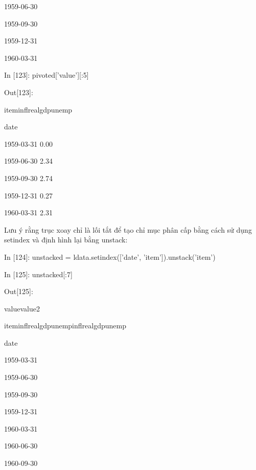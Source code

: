 \par\quad\textup 1959-06-30
\par\quad\textup 1959-09-30
\par\quad\textup 1959-12-31
\par\quad\textup 1960-03-31
\par\quad\textup In [123]: pivoted['value'][:5]
\par\quad\textup Out[123]:
\par\quad\textup item\quad\quad\quad infl\quad\quad realgdp\quad unemp
\par\quad date
\par\quad\textup 1959-03-31 0.00
\par\quad\textup 1959-06-30 2.34
\par\quad\textup 1959-09-30 2.74
\par\quad\textup 1959-12-31 0.27
\par\quad\textup 1960-03-31 2.31
\par\quad\textup Lưu ý rằng trục xoay chỉ là lối tắt để tạo chỉ mục phân cấp bằng cách sử dụng set\textunderscore index và định hình lại bằng unstack:
\par\quad\textup In [124]: unstacked = ldata.set\textunderscore index(['date', 'item']).unstack('item')
\par\quad\textup In [125]: unstacked[:7]
\par\quad\textup Out[125]:
\par\quad\textup\quad\quad\quad\quad\quad value\quad\quad\quad\quad\quad\quad\quad\quad\quad value2
\par\quad\textup item\quad\quad\quad\quad infl\quad\quad realgdp\quad unemp\quad infl\quad\quad realgdp\quad\quad unemp
\par\quad date
\par\quad\textup 1959-03-31
\par\quad\textup 1959-06-30
\par\quad\textup 1959-09-30
\par\quad\textup 1959-12-31
\par\quad\textup 1960-03-31
\par\quad\textup 1960-06-30
\par\quad\textup 1960-09-30
